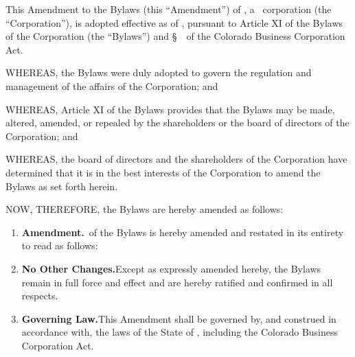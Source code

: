 
\bigskip

This Amendment to the Bylaws (this ``Amendment'') of \companyName, a \companyState\
corporation (the ``Corporation''), is adopted effective as of \effectiveDate, pursuant to
Article XI of the Bylaws of the Corporation (the ``Bylaws'') and \S~\statuteCite\ of the
Colorado Business Corporation Act.

\bigskip


\noindent WHEREAS, the Bylaws were duly adopted to govern the regulation and management of the
affairs of the Corporation; and

\smallskip

\noindent WHEREAS, Article XI of the Bylaws provides that the Bylaws may be made, altered,
amended, or repealed by the shareholders or the board of directors of the Corporation; and

\smallskip

\noindent WHEREAS, the board of directors and the shareholders of the Corporation have
determined that it is in the best interests of the Corporation to amend the Bylaws as set
forth herein.

\bigskip

\noindent NOW, THEREFORE, the Bylaws are hereby amended as follows:

\smallskip

\begin{enumerate}[leftmargin=*, label=\arabic*.]
	\item \textbf{Amendment.}\enspace \amendedSection\ of the Bylaws is hereby amended and
	restated in its entirety to read as follows:

	\smallskip
	\begin{quote}
		\amendedText
	\end{quote}

	\item \textbf{No Other Changes.}\enspace Except as expressly amended hereby, the Bylaws
	remain in full force and effect and are hereby ratified and confirmed in all respects.

	\item \textbf{Governing Law.}\enspace This Amendment shall be governed by, and construed in
	accordance with, the laws of the State of \companyState, including the Colorado Business
	Corporation Act.
\end{enumerate}

